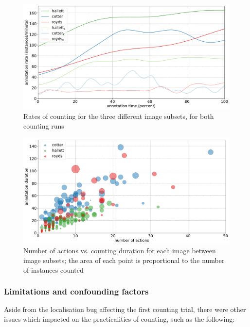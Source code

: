 \begin{figure}[ht]
\centering
\includegraphics[width=1.0\linewidth]{charts/aerial_penguins/summaries/instance_rates.pdf}
\caption{ Rates of counting for the three different image subsets, for both counting runs }
\label{fig:penguin_rates}
\end{figure}

\begin{figure}[ht]
\centering
\includegraphics[width=1.0\linewidth]{charts/aerial_penguins/actions_time_a.pdf}
\caption{ Number of actions vs. counting duration for each image between image subsets; the area of each point is proportional to the number of instances counted }
\label{fig:actions_time_penguins}
\end{figure}


\subsubsection{Limitations and confounding factors}

Aside from the localisation bug affecting the first counting trial, there were other issues which impacted on the practicalities of  counting, such as the following:

